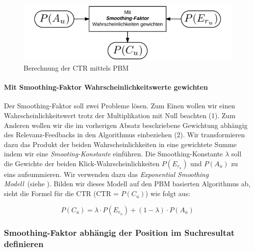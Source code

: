 \begin{figure}[H]
\centering
\vspace{-1em}
\caption[Berechnung der CTR mittels PBM]{Berechnung der CTR mittels PBM}
\label{fig:BerechnungCTRmittelsPBM}
\includegraphics[width=.5\linewidth]{gfx/BerechnungCTRmittelsPBM}
\vspace{-2.5em}
\end{figure}

\paragraph{Mit Smoothing-Faktor Wahrscheinlichkeitswerte gewichten}
Der Smoothing-Faktor soll zwei Probleme lösen. Zum Einen wollen wir einen Wahrscheinlichkeitswert trotz der Multiplikation mit Null beachten (1). Zum Anderen wollen wir die im vorherigen Absatz beschriebene Gewichtung abhängig des Relevanz-Feedbacks in den Algorithmus einbeziehen (2). Wir transformieren dazu das Produkt der beiden Wahrscheinlichkeiten in eine gewichtete Summe indem wir eine \textit{Smooting-Konstante} einführen. Die Smoothing-Konstante $\lambda$ soll die Gewichte der beiden Klick-Wahrscheinlichkeiten $P(E_{r_{u}})$ und $P(A_{u})$ zu eins aufsummieren. Wir verwenden dazu das \textit{Exponential Smoothing Modell}~(siehe \cite{ExpSmoothing}). Bilden wir dieses Modell auf den PBM basierten Algorithmus ab, sieht die Formel für die CTR (CTR = $P(C_{u})$) wie folgt aus:
  
\vspace{-1.5em}
\begin{equation}
	P(C_{u}) = \lambda\cdot P(E_{r_{u}}) + (1 - \lambda)\cdot P(A_{u})
\end{equation}
\vspace{-1.5em}

\subsubsection{Smoothing-Faktor abhängig der Position im Suchresultat definieren}
\label{sec:Reranking:Methodik:Result-RerankingPBM:VerhaeltnisKlick-Wahrscheinlichkeiten}

